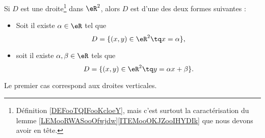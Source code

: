 \begin{lemma}       \label{LEMooYIHXooEwmlPo}
	Si \( D\) est une droite\footnote{Définition \ref{DEFooTQIFooKcloeY}, mais c'est surtout la caractérisation du lemme \ref{LEMooRWASooOfwjdw}\ref{ITEMooOKJZooIHYDIk} que nous devons avoir en tête.} dans \( \eR^2\), alors \( D\) est d'une des deux formes suivantes :
	\begin{itemize}
		\item Soit il existe \( \alpha\in \eR\) tel que
		      \begin{equation}
			      D=\{ (x,y)\in \eR^2\tq x=\alpha \},
		      \end{equation}
		\item soit il existe \( \alpha,\beta\in \eR\) tels que
		      \begin{equation}
			      D=\{ (x,y)\in \eR^2\tq y=\alpha x+\beta \}.
		      \end{equation}
	\end{itemize}
	Le premier cas correspond aux droites verticales.
\end{lemma}

